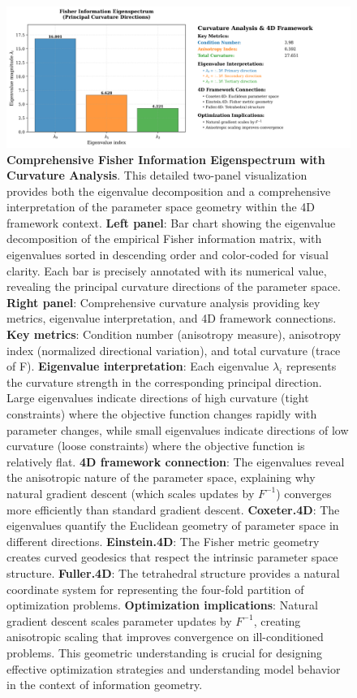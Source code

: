 \documentclass[
  10pt,
]{article}
\begin{document}
\begin{figure}
\centering
\includegraphics{../output/figures/fisher_information_eigenspectrum.png}
\caption{\textbf{Comprehensive Fisher Information Eigenspectrum with
Curvature Analysis}. This detailed two-panel visualization provides both
the eigenvalue decomposition and a comprehensive interpretation of the
parameter space geometry within the 4D framework context. \textbf{Left
panel}: Bar chart showing the eigenvalue decomposition of the empirical
Fisher information matrix, with eigenvalues sorted in descending order
and color-coded for visual clarity. Each bar is precisely annotated with
its numerical value, revealing the principal curvature directions of the
parameter space. \textbf{Right panel}: Comprehensive curvature analysis
providing key metrics, eigenvalue interpretation, and 4D framework
connections. \textbf{Key metrics}: Condition number (anisotropy
measure), anisotropy index (normalized directional variation), and total
curvature (trace of F). \textbf{Eigenvalue interpretation}: Each
eigenvalue \(\lambda_i\) represents the curvature strength in the
corresponding principal direction. Large eigenvalues indicate directions
of high curvature (tight constraints) where the objective function
changes rapidly with parameter changes, while small eigenvalues indicate
directions of low curvature (loose constraints) where the objective
function is relatively flat. \textbf{4D framework connection}: The
eigenvalues reveal the anisotropic nature of the parameter space,
explaining why natural gradient descent (which scales updates by
\(F^{-1}\)) converges more efficiently than standard gradient descent.
\textbf{Coxeter.4D}: The eigenvalues quantify the Euclidean geometry of
parameter space in different directions. \textbf{Einstein.4D}: The
Fisher metric geometry creates curved geodesics that respect the
intrinsic parameter space structure. \textbf{Fuller.4D}: The tetrahedral
structure provides a natural coordinate system for representing the
four-fold partition of optimization problems. \textbf{Optimization
implications}: Natural gradient descent scales parameter updates by
\(F^{-1}\), creating anisotropic scaling that improves convergence on
ill-conditioned problems. This geometric understanding is crucial for
designing effective optimization strategies and understanding model
behavior in the context of information geometry.}
\end{figure}
\end{document}
